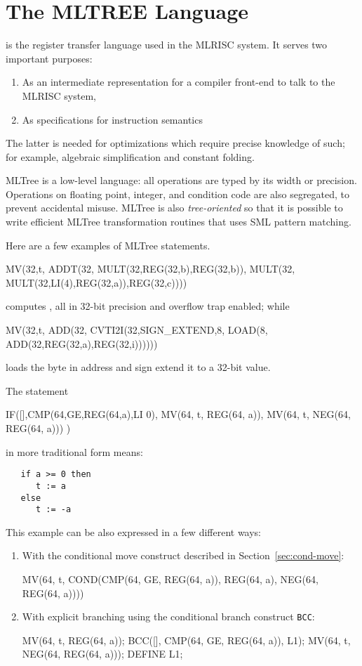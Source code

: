 \section{The MLTREE Language}

 is the 
register transfer language used in the MLRISC system.
It serves two important purposes:
\begin{enumerate}
\item As an intermediate representation for a compiler front-end 
  to talk to the MLRISC system,
\item As specifications for instruction semantics
\end{enumerate}
The latter is needed for optimizations which require precise knowledge of such;
for example, algebraic simplification and constant folding.

MLTree is a low-level  language: 
all operations are typed by its width or precision.  
Operations on floating point, integer, and condition code 
are also segregated, to prevent accidental misuse. 
MLTree is also \emph{tree-oriented} so that it is possible to write efficient
MLTree transformation routines that uses SML pattern matching.

Here are a few examples of MLTree statements.
\begin{SML}
   MV(32,t,
      ADDT(32,
        MULT(32,REG(32,b),REG(32,b)),
        MULT(32,
          MULT(32,LI(4),REG(32,a)),REG(32,c))))
\end{SML}
computes , all in 32-bit precision and overflow
trap enabled; while
\begin{SML}
   MV(32,t,
      ADD(32,
        CVTI2I(32,SIGN_EXTEND,8,
          LOAD(8,
            ADD(32,REG(32,a),REG(32,i))))))
\end{SML}
loads the byte in address  and sign extend it to a 32-bit
value. 

The statement
\begin{SML}
   IF([],CMP(64,GE,REG(64,a),LI 0),
         MV(64, t, REG(64, a)),
         MV(64, t, NEG(64, REG(64, a)))
     )
\end{SML}
in more traditional form means:
\begin{verbatim}
   if a >= 0 then 
      t := a
   else
      t := -a
\end{verbatim} 
This example can be also expressed in a few different ways: 
\begin{enumerate}
   \item With the conditional move construct described in 
Section~\ref{sec:cond-move}:
     \begin{SML}
    MV(64, t, 
       COND(CMP(64, GE, REG(64, a)), 
            REG(64, a), 
            NEG(64, REG(64, a))))
     \end{SML}
  \item With explicit branching using the conditional branch
construct \verb|BCC|:
    \begin{SML}
     MV(64, t, REG(64, a));
     BCC([], CMP(64, GE, REG(64, a)), L1);
     MV(64, t, NEG(64, REG(64, a)));
     DEFINE L1;
    \end{SML}
\end{enumerate}
